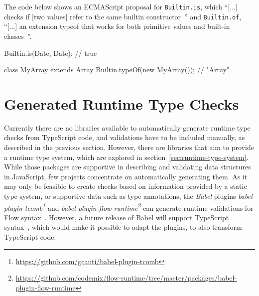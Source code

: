 \begin{program}
\caption{The code below shows an ECMAScript proposal for \texttt{Builtin.is}, which ``[...] checks if [two values] refer to the same builtin constructor~\cite{DynamicTypeChecks:Rauschmayer:2017}'' and \texttt{Builtin.of}, ``[...] an extension typeof that works for both primitive values and built-in classes~\cite{DynamicTypeChecks:Rauschmayer:2017}''.~\cites{DynamicTypeChecks:Rauschmayer:2017, BuiltinProposalRepo}}
\label{prog:runtime-checks-builtin}
\begin{JsCode}
Builtin.is(Date, Date); // true

class MyArray extends Array { }
Builtin.typeOf(new MyArray()); // "Array"
\end{JsCode}
\end{program}



\section{Generated Runtime Type Checks}
\label{sec:existing-projects}

Currently there are no libraries available to automatically generate runtime type checks from TypeScript code, and validations have to be included manually, as described in the previous section. However, there are libraries that aim to provide a runtime type system, which are explored in section~\ref{sec:runtime-type-system}. While those packages are supportive in describing and validating data structures in JavaScript, few projects concentrate on automatically generating them. As it may only be feasible to create checks based on information provided by a static type system, or supportive data such as type annotations, the \emph{Babel} plugins \emph{babel-plugin-tcomb\footnote{\url{https://github.com/gcanti/babel-plugin-tcomb}}} and \emph{babel-plugin-flow-runtime\footnote{\url{https://github.com/codemix/flow-runtime/tree/master/packages/babel-plugin-flow-runtime}}} can generate runtime validations for Flow syntax~\cites{RuntimeTypeSystem:tcomb:babel, RuntimeTypeSystem:flow-runtime:babel}. However, a future release of Babel will support TypeScript syntax~\cite{Babel:TypeScript}, which would make it possible to adapt the plugins, to also transform TypeScript code.
